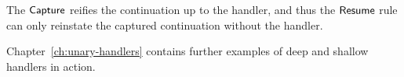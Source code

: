 \documentclass[12pt,phd,lfcs,twoside,openright,logo,leftchapter,normalheadings]{infthesis}
\theoremstyle{plain}
\theoremstyle{definition}
\begin{document}
%
The $\mathsf{Capture}$ reifies the continuation up to the handler, and
thus the $\mathsf{Resume}$ rule can only reinstate the captured
continuation without the handler.
%
%

Chapter~\ref{ch:unary-handlers} contains further examples of deep and
shallow handlers in action.
%

%
\end{document}
